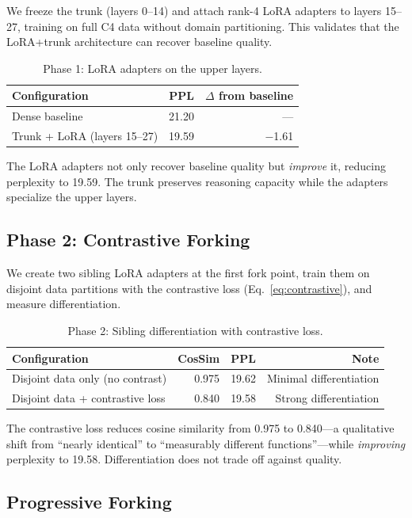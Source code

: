 \documentclass{article}
\begin{document}
We freeze the trunk (layers 0--14) and attach rank-4 LoRA adapters to layers
15--27, training on full C4 data without domain partitioning. This validates
that the LoRA+trunk architecture can recover baseline quality.

\begin{table}[h]
\centering
\caption{Phase 1: LoRA adapters on the upper layers.}
\label{tab:phase1}
\begin{tabular}{@{}lrr@{}}
\toprule
Configuration & PPL & $\Delta$ from baseline \\
\midrule
Dense baseline & 21.20 & --- \\
Trunk + LoRA (layers 15--27) & 19.59 & $-$1.61 \\
\bottomrule
\end{tabular}
\end{table}

The LoRA adapters not only recover baseline quality but \emph{improve} it,
reducing perplexity to 19.59. The trunk preserves reasoning capacity while the
adapters specialize the upper layers.

\subsection{Phase 2: Contrastive Forking}

We create two sibling LoRA adapters at the first fork point, train them on
disjoint data partitions with the contrastive loss (Eq.~\ref{eq:contrastive}),
and measure differentiation.

\begin{table}[h]
\centering
\caption{Phase 2: Sibling differentiation with contrastive loss.}
\label{tab:phase2}
\begin{tabular}{@{}lrrr@{}}
\toprule
Configuration & CosSim & PPL & Note \\
\midrule
Disjoint data only (no contrast) & 0.975 & 19.62 & Minimal differentiation \\
Disjoint data + contrastive loss & 0.840 & 19.58 & Strong differentiation \\
\bottomrule
\end{tabular}
\end{table}

The contrastive loss reduces cosine similarity from 0.975 to 0.840---a
qualitative shift from ``nearly identical'' to ``measurably different
functions''---while \emph{improving} perplexity to 19.58. Differentiation does
not trade off against quality.

\subsection{Progressive Forking}
\label{sec:forking}
\end{document}
